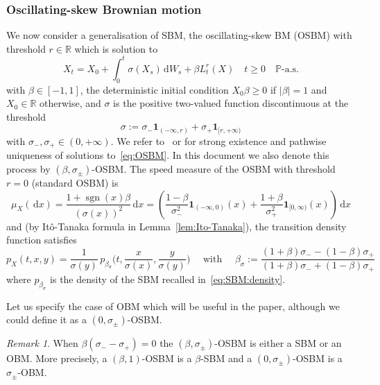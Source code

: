 \documentclass[12pt]{article}
\numberwithin{equation}{section}
\theoremstyle{definition}
\theoremstyle{remark}
\newtheorem{remark}{Remark}
\newcommand{\RR}{\mathbb{R}}
\newcommand{\ind}[1]{\mathbf{1}_{#1}}
\newcommand{\vd}{\,\mathrm{d}}
\DeclareMathOperator{\sgn}{sgn}
\begin{document}
\subsubsection{Oscillating-skew Brownian motion} \label{sec:genera:proc}


We now consider a generalisation of SBM, the oscillating-skew BM (OSBM) with threshold $r\in \RR$ which is solution to 
\begin{equation} \label{eq:OSBM}
	X_t = X_0 + \int_0^t  \sigma(X_s) \vd W_s + \beta L^r_t(X)  \quad t\geq 0 \quad \mathbb{P}\text{-a.s.}
\end{equation}
with $\beta \in [-1,1]$, 
the deterministic initial condition $X_0\beta\geq 0$ if $|\beta|=1$ and $X_0\in \RR$ otherwise, 
and $\sigma$ is the positive two-valued function discontinuous at the threshold  
\begin{equation}
    \label{sigmaOBM}
    \sigma := \sigma_- \ind{(-\infty,r)} + \sigma_+ \ind{[r,+\infty)}
\end{equation}
with $\sigma_-,\sigma_+\in (0,+\infty)$.
We refer to~\cite{legall} or \cite{BassChen05} for strong existence and pathwise uniqueness of solutions to~\eqref{eq:OSBM}.
In this document we also denote this process by $(\beta,\sigma_\pm)$-OSBM.
The speed measure of the OSBM with threshold $r=0$ (standard OSBM) is 
\begin{equation} \label{eq:speedm}
	\mu_X(\!\vd x) %
	= \frac{1+\sgn(x)\beta}{(\sigma(x))^2} \vd x
	= \left( \frac{1-\beta}{\sigma_-^2} \ind{(-\infty,0)}(x) + \frac{1+\beta}{\sigma_+^2} \ind{[0,\infty)}(x) \right)\! \vd x
\end{equation}
and (by It\^o-Tanaka formula in Lemma~\ref{lem:Ito-Tanaka}), the transition density function satisfies
\begin{equation} \label{eq:densities:X}
	p_X(t,x,y)=\frac{1}{\sigma(y)} \, p_{\beta_\sigma}\Big(t, \frac{x}{\sigma(x)}, \frac{y}{\sigma(y)}\Big) 
\quad \text{ with } \quad 
{\beta_\sigma}:= \frac{(1+\beta)\sigma_- -(1-\beta)\sigma_+}{(1+\beta)\sigma_-+(1-\beta)\sigma_+}
\end{equation}
where $p_{\beta_\sigma}$ is the density of the SBM recalled in~\eqref{eq:SBM:density}.


Let us specify the case of OBM which will be useful in the paper, 
although we could define it as a $(0,\sigma_\pm)$-OSBM.
%
\begin{remark}
When $\beta(\sigma_--\sigma_+)=0$ the $(\beta,\sigma_\pm)$-OSBM is either a SBM or an OBM. 
More precisely, a $(\beta,1)$-OSBM is a $\beta$-SBM and a $(0,\sigma_\pm)$-OSBM is a $\sigma_\pm$-OBM. 
\end{remark}
\end{document}
